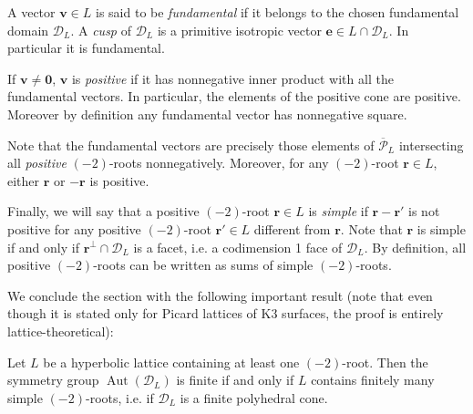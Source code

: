 \documentclass[11pt,letterpaper]{amsart}
\newcommand{\vect}[1]{\boldsymbol{#1}}
\DeclareMathOperator{\Aut}{Aut}
\begin{document}
A vector $\vect{v}\in L$ is said to be \emph{fundamental} if it belongs to the chosen fundamental domain $\mathcal{D}_L$. A \emph{cusp} of $\mathcal{D}_L$ is a primitive isotropic vector $\vect{e} \in L\cap \mathcal{D}_L$. In particular it is fundamental.

If $\vect{v}\ne \vect{0}$, $\vect{v}$ is \emph{positive} if it has nonnegative inner product with all the fundamental vectors. In particular, the elements of the positive cone are positive.
Moreover by definition any fundamental vector has nonnegative square. 

Note that the fundamental vectors are precisely those elements of $\overline{\mathcal{P}}_L$ intersecting all \emph{positive} $(-2)$-roots nonnegatively.
Moreover, for any $(-2)$-root $\vect{r}\in L$, either $\vect{r}$ or $-\vect{r}$ is positive. 

Finally, we will say that a positive $(-2)$-root $\vect{r}\in L$ is \emph{simple} if $\vect{r}-\vect{r'}$ is not positive for any positive $(-2)$-root $\vect{r'}\in L$ different from $\vect{r}$.
Note that $\vect{r}$ is simple if and only if $\vect{r}^\perp \cap \mathcal{D}_L$ is a facet, i.e. a codimension 1 face of $\mathcal{D}_L$. 
By definition, all positive $(-2)$-roots can be written as sums of simple $(-2)$-roots. 

We conclude the section with the following important result (note that even though it is stated only for Picard lattices of K3 surfaces, the proof is entirely lattice-theoretical):

\begin{proposition} \label{prop:finitely.many.roots}
Let $L$ be a hyperbolic lattice containing at least one $(-2)$-root. Then the symmetry group $\Aut(\mathcal{D}_L)$ is finite if and only if $L$ contains finitely many simple $(-2)$-roots, i.e. if $\mathcal{D}_L$ is a finite polyhedral cone.
\end{proposition}
\end{document}
